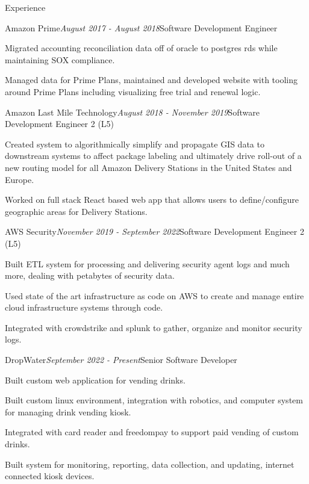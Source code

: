 \documentclass{resume} %
\begin{document}
\begin{rSection}{Experience}

\begin{rSubsection}{Amazon Prime}{\em August 2017 - August 2018}{Software Development Engineer}{}
\item Migrated accounting reconciliation data off of oracle to postgres rds while maintaining SOX compliance.
\item Managed data for Prime Plans, maintained and developed website with tooling around Prime Plans including visualizing free trial and renewal logic.
\end{rSubsection}


\begin{rSubsection}{Amazon Last Mile Technology}{\em August 2018 - November 2019}{Software Development Engineer 2 (L5)}{}
\item Created system to algorithmically simplify and propagate GIS data to downstream systems to affect package labeling and ultimately drive roll-out of a new routing model for all Amazon Delivery Stations in the United States and Europe.
\item Worked on full stack React based web app that allows users to define/configure geographic areas for Delivery Stations.
\end{rSubsection}

\begin{rSubsection}{AWS Security}{\em November 2019 - September 2022}{Software Development
Engineer 2 (L5)}{} \item Built ETL system for processing and delivering security agent
logs and much more, dealing with petabytes of security data. \item Used state of the art
infrastructure as code on AWS to create and manage entire cloud infrastructure systems
through code. \item Integrated with crowdstrike and splunk to gather, organize and monitor
security logs. \end{rSubsection}


\begin{rSubsection}{DropWater}{\em September 2022 - Present}{Senior Software Developer}{}
\item Built custom web application for vending drinks.

\item Built custom linux environment, integration with robotics, and computer system for
managing drink vending kiosk.

\item Integrated with card reader and freedompay to support paid vending of custom
drinks.

\item Built system for monitoring, reporting, data collection, and updating, internet
connected kiosk devices.

\end{rSubsection}
\end{rSection}
\end{document}
